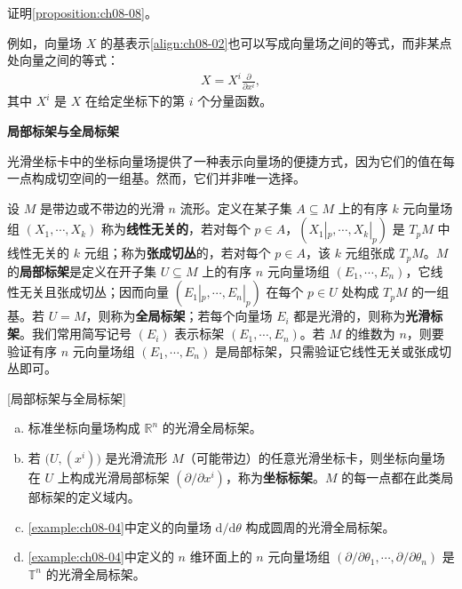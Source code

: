 \documentclass[../../main.tex]{subfiles}
\begin{document}
\begin{exercise}\label{exercise:ch08-09}
证明\cref{proposition:ch08-08}。
\end{exercise}

例如，向量场 $X$ 的基表示\eqref{align:ch08-02}也可以写成向量场之间的等式，而非某点处向量之间的等式：
\begin{align*}
X=X^i\frac{\partial}{\partial x^i},
\end{align*}
其中 $X^i$ 是 $X$ 在给定坐标下的第 $i$ 个分量函数。

\textbf{局部标架与全局标架}

光滑坐标卡中的坐标向量场提供了一种表示向量场的便捷方式，因为它们的值在每一点构成切空间的一组基。然而，它们并非唯一选择。

设 $M$ 是带边或不带边的光滑 $n$ 流形。定义在某子集 $A\subseteq M$ 上的有序 $k$ 元向量场组 $(X_1,\cdots ,X_k)$ 称为\textbf{线性无关的}，若对每个 $p\in A$，$(X_1|_p,\cdots ,X_k|_p)$ 是 $T_pM$ 中线性无关的 $k$ 元组；称为\textbf{张成切丛}的，若对每个 $p\in A$，该 $k$ 元组张成 $T_pM$。$M$ 的\textbf{局部标架}是定义在开子集 $U\subseteq M$ 上的有序 $n$ 元向量场组 $(E_1,\cdots ,E_n)$，它线性无关且张成切丛；因而向量 $(E_1|_p,\cdots ,E_n|_p)$ 在每个 $p\in U$ 处构成 $T_pM$ 的一组基。若 $U=M$，则称为\textbf{全局标架}；若每个向量场 $E_i$ 都是光滑的，则称为\textbf{光滑标架}。我们常用简写记号 $(E_i)$ 表示标架 $(E_1,\cdots ,E_n)$。若 $M$ 的维数为 $n$，则要验证有序 $n$ 元向量场组 $(E_1,\cdots ,E_n)$ 是局部标架，只需验证它线性无关或张成切丛即可。

\begin{example}\label{example:ch08-10}[局部标架与全局标架]
\begin{enumerate}[(a)]
\item 标准坐标向量场构成 $\mathbb{R}^n$ 的光滑全局标架。

\item 若 $\bigl(U,(x^i)\bigr)$ 是光滑流形 $M$（可能带边）的任意光滑坐标卡，则坐标向量场在 $U$ 上构成光滑局部标架 $(\partial/\partial x^i)$，称为\textbf{坐标标架}。$M$ 的每一点都在此类局部标架的定义域内。

\item \cref{example:ch08-04}中定义的向量场 $\mathrm{d}/\mathrm{d}\theta$ 构成圆周的光滑全局标架。

\item \cref{example:ch08-04}中定义的 $n$ 维环面上的 $n$ 元向量场组 $(\partial/\partial\theta_1,\cdots ,\partial/\partial\theta_n)$ 是 $\mathbb{T}^n$ 的光滑全局标架。
\end{enumerate}
\end{example}
\end{document}
